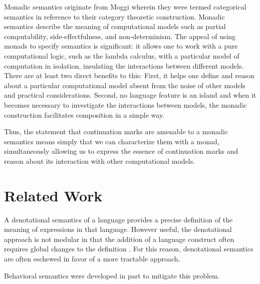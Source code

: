 \documentclass[ms]{byuprop} %
\begin{document}
Monadic semantics originate from Moggi \cite{moggi1989computational} wherein they were
termed categorical semantics in reference to their category theoretic construction.
Monadic semantics describe the meaning of computational models such as partial
computability, side-effectfulness, and non-determinism. The appeal of using monads to
specify semantics is significant: it allows one to work with a pure computational logic,
such as the lambda calculus, with a particular model of computation in isolation,
insulating the interactions between different models. There are at least two direct
benefits to this: First, it helps one define and reason about a particular computational
model absent from the noise of other models and practical considerations. Second, no
language feature is an island and when it becomes necessary to investigate the
interactions between models, the monadic construction facilitates composition in a simple
way.


Thus, the statement that continuation marks are amenable to a monadic semantics means
simply that we can characterize them with a monad, simultaneously allowing us to express
the essence of continuation marks and reason about its interaction with other
computational models.


\section{Related Work}

A denotational semantics of a language provides a precise definition of the meaning of
expressions in that language. However useful, the denotational approach is not modular in
that the addition of a language construct often requires global changes to the definition
\cite{liang2009modular}. For this reason, denotational semantics are often eschewed in
favor of a more tractable approach.

Behavioral semantics were developed in part to mitigate this problem.

\end{document}
